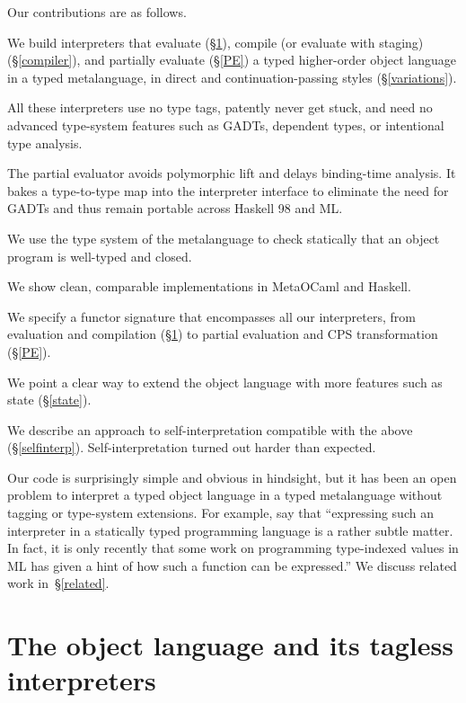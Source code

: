 \documentclass[preprint]{sigplanconf}
\begin{document}
Our contributions are as follows.
\begin{enumerate*}
\item We build interpreters that evaluate (\S\ref{language}),
    compile (or evaluate with staging) (\S\ref{compiler}), and partially evaluate (\S\ref{PE}) a typed higher-order object language
   in a typed metalanguage, in direct and continuation\hyp passing styles
   (\S\ref{variations}).
\item All these interpreters use no type tags, patently never get stuck,
    and need no advanced type-system features such as GADTs, dependent types,
    or intentional type analysis.
\item The partial evaluator avoids polymorphic lift and delays binding-time
    analysis.  It bakes a type-to-type map into the interpreter
    interface to eliminate the need for GADTs and thus remain portable
    across Haskell 98 and ML.
\item We use the type system of the metalanguage
    to check statically that an object program is well-typed and closed.
\item We show clean, comparable implementations in MetaOCaml and Haskell.
\item We specify a functor signature that encompasses all our interpreters, from
    evaluation and compilation (\S\ref{language}) to partial evaluation and CPS transformation (\S\ref{PE}).
\item We point a clear way to extend the object language with more features
    such as state (\S\ref{state}).
\item We describe an approach to self\hyp interpretation compatible with the
  above (\S\ref{selfinterp}).  Self\hyp interpretation turned out harder than expected.
\end{enumerate*}
Our code is surprisingly simple and obvious in hindsight, but
it has been an open problem to
interpret a typed object language in a typed metalanguage without
tagging or type\hyp system extensions.  For example, \citet{taha-tag}
say that ``expressing such an interpreter in a statically typed
programming language is a rather subtle matter. In fact, it is only
recently that some work on programming type-indexed values in ML
\citep{yang-encoding} has given a hint of how such a function can be
expressed.''  We discuss related work in~\S\ref{related}.

\section{The object language and its tagless interpreters}\label{language}
\end{document}
